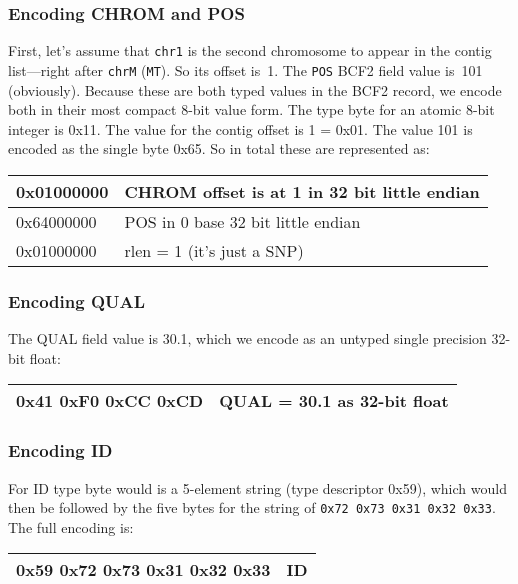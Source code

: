 \documentclass[8pt]{article}
\begin{document}
\subsubsection{Encoding CHROM and POS}

First, let's assume that {\tt chr1} is the second chromosome to appear in the
contig list---right after {\tt chrM} ({\tt MT}).  So its offset is~1.
The {\tt POS} BCF2 field value is~101 (obviously).  Because these are both
typed values in the BCF2 record, we encode both in their most compact 8-bit
value form.  The type byte for an atomic 8-bit integer is 0x11.  The value for
the contig offset is 1 = 0x01.  The value 101 is encoded as the single byte
0x65.  So in total these are represented as:

\vspace{0.3cm}
\begin{tabular}{|l | l|} \hline
0x01000000 & CHROM offset is at 1 in 32 bit little endian \\ \hline
0x64000000 & POS in 0 base 32 bit little endian \\ \hline
0x01000000 & rlen = 1 (it's just a SNP) \\ \hline
\end{tabular}

\subsubsection{Encoding QUAL}

The QUAL field value is 30.1, which we encode as an untyped single precision
32-bit float:

\vspace{0.3cm}
\begin{tabular}{|l| l|} \hline
0x41 0xF0 0xCC 0xCD & QUAL = 30.1 as 32-bit float \\ \hline
\end{tabular}

\subsubsection{Encoding ID}

For ID type byte would is a 5-element string (type descriptor 0x59),
which would then be followed by the five bytes for the string of
{\tt 0x72 0x73 0x31 0x32 0x33}.  The full encoding is:

\vspace{0.3cm}
\begin{tabular}{|l| l|} \hline
0x59 0x72 0x73 0x31 0x32 0x33 & ID \\ \hline
\end{tabular}
\end{document}
